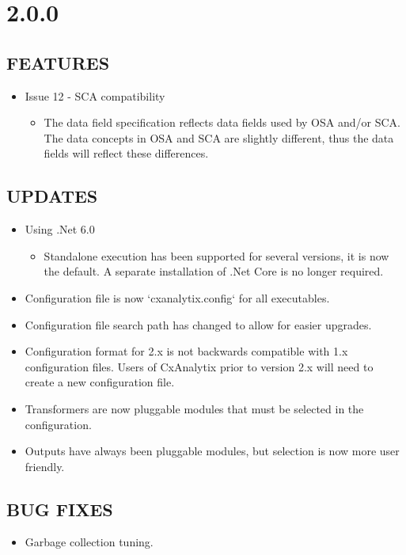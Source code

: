 \section{2.0.0}

\subsection*{FEATURES}
    \begin{itemize}
        \item Issue 12 - SCA compatibility
        \begin{itemize}
            \item The data field specification reflects data fields used by OSA and/or SCA.  The data concepts in OSA and SCA 
            are slightly different, thus the data fields will reflect these differences.
        \end{itemize}
    \end{itemize}

\subsection*{UPDATES}
    \begin{itemize}
        \item Using .Net 6.0
            \begin{itemize}
                \item Standalone execution has been supported for several versions, it is now the default.  A separate installation of .Net Core is no longer required.
            \end{itemize}
        \item Configuration file is now `cxanalytix.config` for all executables.
        \item Configuration file search path has changed to allow for easier upgrades.
        \item Configuration format for 2.x is not backwards compatible with 1.x configuration files.  Users of CxAnalytix prior to version 2.x will need 
        to create a new configuration file.
        \item Transformers are now pluggable modules that must be selected in the configuration.
        \item Outputs have always been pluggable modules, but selection is now more user friendly.
    \end{itemize}

\subsection*{BUG FIXES}
    \begin{itemize}
        \item Garbage collection tuning.
    \end{itemize}


